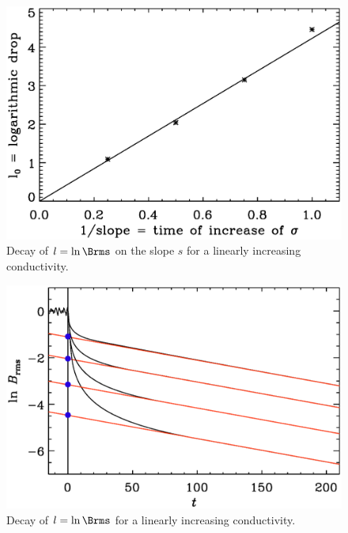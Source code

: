 \documentclass[twocolumn]{article}
\begin{document}
\begin{figure}[b!]\begin{center}
\includegraphics[width=\columnwidth]{plaw}
\end{center}\caption[]{
Decay of $l=\ln\Brms$ on the slope $s$
for a linearly increasing conductivity.
}\label{plaw}\end{figure}

\begin{figure}[b!]\begin{center}
\includegraphics[width=\columnwidth]{pcomp_decay}
\end{center}\caption[]{
Decay of $l=\ln\Brms$ for a linearly increasing conductivity.
}\label{pcomp_decay}\end{figure}
\end{document}
